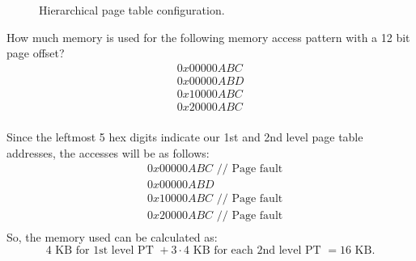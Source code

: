 \begin{figure}[H]
  \centering
  \caption{Hierarchical page table configuration.}
  \label{fig:hierpt}
\end{figure}

\begin{problem}
  How much memory is used for the following memory access pattern with a 12 bit page offset?
  \begin{align*}
    0x0000 0ABC \\
    0x0000 0ABD \\
    0x1000 0ABC \\
    0x2000 0ABC \\
  \end{align*}
\end{problem}
\begin{answer}
  Since the leftmost 5 hex digits indicate our 1st and 2nd level page table addresses, the accesses will be as follows:
  \begin{align*}
    &0x0000 0ABC \text{ // Page fault} \\
    &0x0000 0ABD \\
    &0x1000 0ABC \text{ // Page fault} \\
    &0x2000 0ABC \text{ // Page fault} \\
  \end{align*}
  So, the memory used can be calculated as:
  \[
    4 \text{ KB for 1st level PT } + 3 \cdot 4 \text{ KB for each 2nd level PT } = 16 \text{ KB}.
  \]
\end{answer}

